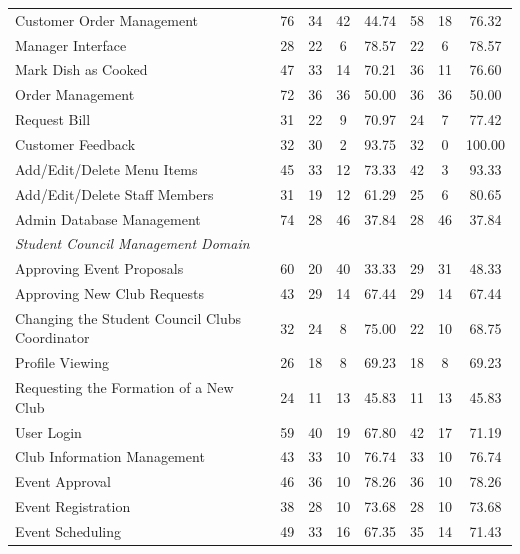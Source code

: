 \begin{table}[t]
\begin{tabular}{lccccccc}
Customer Order Management & 76 & 34 & 42 & 44.74 & 58 & 18 & 76.32 \\
Manager Interface & 28 & 22 & 6 & 78.57 & 22 & 6 & 78.57 \\
Mark Dish as Cooked & 47 & 33 & 14 & 70.21 & 36 & 11 & 76.60 \\
Order Management & 72 & 36 & 36 & 50.00 & 36 & 36 & 50.00 \\
Request Bill & 31 & 22 & 9 & 70.97 & 24 & 7 & 77.42 \\
Customer Feedback & 32 & 30 & 2 & 93.75 & 32 & 0 & 100.00 \\
Add/Edit/Delete Menu Items & 45 & 33 & 12 & 73.33 & 42 & 3 & 93.33 \\
Add/Edit/Delete Staff Members & 31 & 19 & 12 & 61.29 & 25 & 6 & 80.65 \\
Admin Database Management & 74 & 28 & 46 & 37.84 & 28 & 46 & 37.84 \\
\midrule
\multicolumn{8}{l}{\textit{Student Council Management Domain}} \\
Approving Event Proposals & 60 & 20 & 40 & 33.33 & 29 & 31 & 48.33 \\
Approving New Club Requests & 43 & 29 & 14 & 67.44 & 29 & 14 & 67.44 \\
Changing the Student Council Clubs Coordinator & 32 & 24 & 8 & 75.00 & 22 & 10 & 68.75 \\
Profile Viewing & 26 & 18 & 8 & 69.23 & 18 & 8 & 69.23 \\
Requesting the Formation of a New Club & 24 & 11 & 13 & 45.83 & 11 & 13 & 45.83 \\
User Login & 59 & 40 & 19 & 67.80 & 42 & 17 & 71.19 \\
Club Information Management & 43 & 33 & 10 & 76.74 & 33 & 10 & 76.74 \\
Event Approval & 46 & 36 & 10 & 78.26 & 36 & 10 & 78.26 \\
Event Registration & 38 & 28 & 10 & 73.68 & 28 & 10 & 73.68 \\
Event Scheduling & 49 & 33 & 16 & 67.35 & 35 & 14 & 71.43 \\
\bottomrule
\end{tabular}
\end{table}
